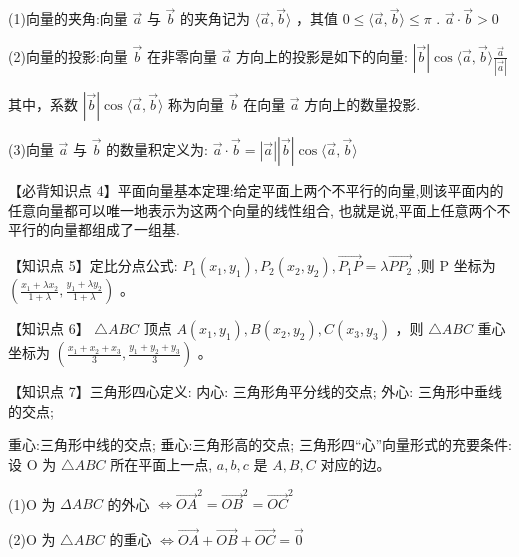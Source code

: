 \documentclass[10pt]{article}
\begin{document}
(1)向量的夹角:向量 \(\overrightarrow{a}\) 与 \(\overrightarrow{b}\) 的夹角记为 \(\langle \overrightarrow{a},\overrightarrow{b}\rangle\) ，其值 \(0 \leq  \langle \overrightarrow{a},\overrightarrow{b}\rangle  \leq  \pi\) . \(\overrightarrow{a} \cdot  \overrightarrow{b} > 0\)

(2)向量的投影:向量 \(\overrightarrow{b}\) 在非零向量 \(\overrightarrow{a}\) 方向上的投影是如下的向量: \(\left| \overrightarrow{b}\right| \cos \langle \overrightarrow{a},\overrightarrow{b}\rangle \frac{\overrightarrow{a}}{\left| \overrightarrow{a}\right| }\)

其中，系数 \(\left| \overrightarrow{b}\right| \cos \langle \overrightarrow{a},\overrightarrow{b}\rangle\) 称为向量 \(\overrightarrow{b}\) 在向量 \(\overrightarrow{a}\) 方向上的数量投影.

(3)向量 \(\overrightarrow{a}\) 与 \(\overrightarrow{b}\) 的数量积定义为: \(\overrightarrow{a} \cdot  \overrightarrow{b} = \left| \overrightarrow{a}\right| \left| \overrightarrow{b}\right| \cos \langle \overrightarrow{a},\overrightarrow{b}\rangle\)

【必背知识点 4】平面向量基本定理:给定平面上两个不平行的向量,则该平面内的任意向量都可以唯一地表示为这两个向量的线性组合, 也就是说,平面上任意两个不平行的向量都组成了一组基.

【知识点 5】定比分点公式: \({P}_{1}\left( {{x}_{1},{y}_{1}}\right) ,{P}_{2}\left( {{x}_{2},{y}_{2}}\right) ,\overrightarrow{{P}_{1}P} = \lambda \overrightarrow{P{P}_{2}}\) ,则 \(\mathrm{P}\) 坐标为 \(\left( {\frac{{x}_{1} + \lambda {x}_{2}}{1 + \lambda },\frac{{y}_{1} + \lambda {y}_{2}}{1 + \lambda }}\right)\) 。

【知识点 6】 \(\bigtriangleup {ABC}\) 顶点 \(A\left( {{x}_{1},{y}_{1}}\right) ,B\left( {{x}_{2},{y}_{2}}\right) ,C\left( {{x}_{3},{y}_{3}}\right)\) ，则 \(\bigtriangleup {ABC}\) 重心坐标为 \(\left( {\frac{{x}_{1} + {x}_{2} + {x}_{3}}{3},\frac{{y}_{1} + {y}_{2} + {y}_{3}}{3}}\right)\) 。

【知识点 7】三角形四心定义: 内心: 三角形角平分线的交点; 外心: 三角形中垂线的交点;

重心:三角形中线的交点; 垂心:三角形高的交点; 三角形四“心”向量形式的充要条件: 设 \(\mathrm{O}\) 为 \(\bigtriangleup {ABC}\) 所在平面上一点, \(a,b,c\) 是 \(A,B,C\) 对应的边。

(1)O 为 \({\Delta ABC}\) 的外心 \(\Leftrightarrow  {\overrightarrow{OA}}^{2} = {\overrightarrow{OB}}^{2} = {\overrightarrow{OC}}^{2}\)

(2)O 为 \(\bigtriangleup {ABC}\) 的重心 \(\Leftrightarrow  \overrightarrow{OA} + \overrightarrow{OB} + \overrightarrow{OC} = \overrightarrow{0}\)
\end{document}

